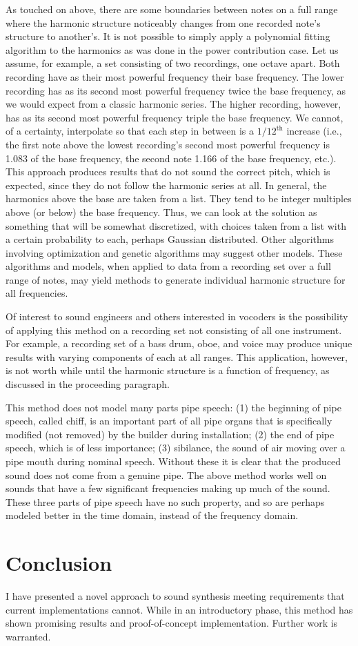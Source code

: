 \documentclass{article}
\begin{document}
As touched on above, there are some boundaries between notes on a full range where the harmonic structure noticeably changes from one recorded note's structure to another's. It is not possible to simply apply a polynomial fitting algorithm to the harmonics as was done in the power contribution case. Let us assume, for example, a set consisting of two recordings, one octave apart. Both recording have as their most powerful frequency their base frequency. The lower recording has as its second most powerful frequency twice the base frequency, as we would expect from a classic harmonic series. The higher recording, however, has as its second most powerful frequency triple the base frequency. We cannot, of a certainty, interpolate so that each step in between is a $1/12^\mathrm{th}$ increase (i.e., the first note above the lowest recording's second most powerful frequency is 1.083 of the base frequency, the second note 1.166 of the base frequency, etc.). This approach produces results that do not sound the correct pitch, which is expected, since they do not follow the harmonic series at all. In general, the harmonics above the base are taken from a list. They tend to be integer multiples above (or below) the base frequency. Thus, we can look at the solution as something that will be somewhat discretized, with choices taken from a list with a certain probability to each, perhaps Gaussian distributed. Other algorithms involving optimization and genetic algorithms may suggest other models. These algorithms and models, when applied to data from a recording set over a full range of notes, may yield methods to generate individual harmonic structure for all frequencies.

Of interest to sound engineers and others interested in vocoders is the possibility of applying this method on a recording set not consisting of all one instrument. For example, a recording set of a bass drum, oboe, and voice may produce unique results with varying components of each at all ranges. This application, however, is not worth while until the harmonic structure is a function of frequency, as discussed in the proceeding paragraph.

This method does not model many parts pipe speech: (1) the beginning of pipe speech, called chiff, is an important part of all pipe organs that is specifically modified (not removed) by the builder during installation; (2) the end of pipe speech, which is of less importance; (3) sibilance, the sound of air moving over a pipe mouth during nominal speech. Without these it is clear that the produced sound does not come from a genuine pipe. The above method works well on sounds that have a few significant frequencies making up much of the sound. These three parts of pipe speech have no such property, and so are perhaps modeled better in the time domain, instead of the frequency domain.

\section{Conclusion}

I have presented a novel approach to sound synthesis meeting requirements that current implementations cannot. While in an introductory phase, this method has shown promising results and proof-of-concept implementation. Further work is warranted.
\end{document}
